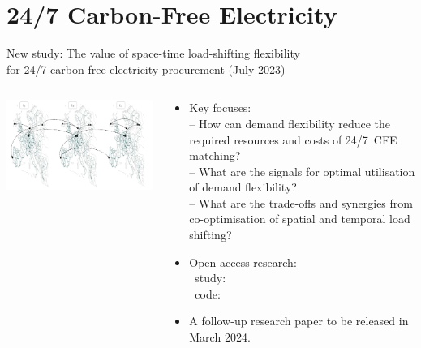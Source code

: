 \section{24/7 Carbon-Free Electricity}
\begin{frame}{New study: The value of space-time load-shifting flexibility \\ 
  for 24/7 carbon-free electricity procurement (July 2023)}
  
    {\small
    \begin{columns}
    \begin{column}{9cm}
    \includegraphics[width=10cm]{images/spatial-temporal-vlinks-cropped.png}
    \end{column}
  
    \begin{column}{6cm}
  
    \begin{itemize}
      \vspace{-0.2cm}
       \item Key focuses: \\
     -- How can demand flexibility reduce the required \alert{resources} and \alert{costs} of 24/7~CFE matching?\\ 
     \vspace{0.1cm}
     -- What are the \alert{signals} for optimal utilisation of demand flexibility?\\
     \vspace{0.1cm}
     -- What are the trade-offs and synergies from co-optimisation of \alert{spatial} and \alert{temporal} load shifting?
  
     \item Open-access research: \\
     \vspace{0.2cm}
     {\footnotesize
     \faUnlock~study:
     \\
     \faUnlock~code:
     \\
     }

     \item  A follow-up research paper to be released in March 2024.
  
    \end{itemize}
    \end{column}
    \end{columns}
    }
  \end{frame}
  
